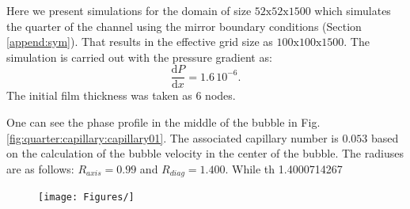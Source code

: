 \documentclass{article}
\begin{document}
Here we present simulations for the domain of size $52\mathrm{x}52\mathrm{x}1500$ which simulates
the quarter of the channel using the mirror boundary conditions (Section \ref{append:sym}). That
results in the effective grid size as $100\mathrm{x}100\mathrm{x}1500$. The simulation is carried
out with the pressure gradient as:
\begin{equation}
\frac{\mathrm{d}P}{\mathrm{d}x}=1.6\,10^{-6}.
\end{equation}
The initial film thickness was taken as $6$ nodes. 

One can see the phase profile in the middle of the bubble in
Fig.\ref{fig:quarter:capillary:capillary01}. The associated capillary number is $0.053$ based on
the calculation of the bubble velocity in the center of the bubble. The radiuses are as follows:
$R_{axis}=0.99$ and $R_{diag}=1.400$. While th  
1.4000714267 
 

\begin{figure}
\texttt{[image: Figures/]}
\end{figure}
 
\end{document}

